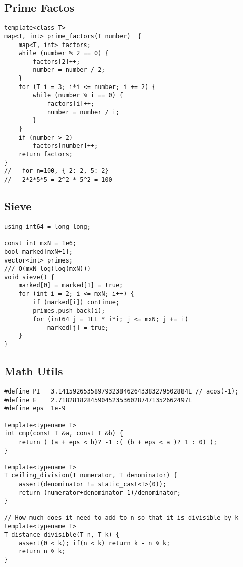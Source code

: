 \documentclass[10pt,letterpaper,twocolumn,twosided]{article}
\begin{document}
\subsection{Prime Factos}
\begin{lstlisting}
template<class T>
map<T, int> prime_factors(T number)  {
    map<T, int> factors;
    while (number % 2 == 0) {
        factors[2]++;
        number = number / 2;
    }
    for (T i = 3; i*i <= number; i += 2) {
        while (number % i == 0) {
            factors[i]++;
            number = number / i; 
        }
    }
    if (number > 2)
        factors[number]++;
    return factors;
}
//   for n=100, { 2: 2, 5: 2}
//   2*2*5*5 = 2^2 * 5^2 = 100
\end{lstlisting}

\subsection{Sieve}
\begin{lstlisting}
using int64 = long long;

const int mxN = 1e6;
bool marked[mxN+1];
vector<int> primes;
/// O(mxN log(log(mxN)))
void sieve() {
    marked[0] = marked[1] = true;
    for (int i = 2; i <= mxN; i++) {
        if (marked[i]) continue;
        primes.push_back(i);
        for (int64 j = 1LL * i*i; j <= mxN; j += i)
            marked[j] = true;
    }
}
\end{lstlisting}

\subsection{Math Utils}
\begin{lstlisting}
#define PI   3.141592653589793238462643383279502884L // acos(-1);
#define E    2.718281828459045235360287471352662497L
#define eps  1e-9

template<typename T>
int cmp(const T &a, const T &b) {
    return ( (a + eps < b)? -1 :( (b + eps < a )? 1 : 0) );
}

template<typename T>
T ceiling_division(T numerator, T denominator) {
    assert(denominator != static_cast<T>(0));
    return (numerator+denominator-1)/denominator;
}

// How much does it need to add to n so that it is divisible by k
template<typename T>
T distance_divisible(T n, T k) {
    assert(0 < k); if(n < k) return k - n % k;
    return n % k;
}
\end{lstlisting}

\end{document}
